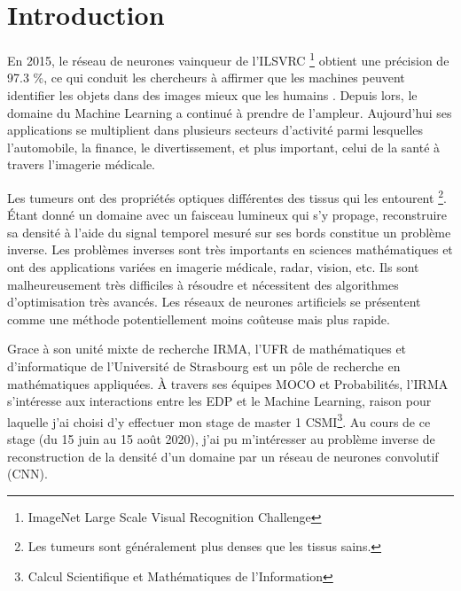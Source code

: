 
\chapter{Introduction} %

\label{Chapter1} %


\newcommand{\keyword}[1]{\textbf{#1}}
\newcommand{\tabhead}[1]{\textbf{#1}}
\newcommand{\code}[1]{\texttt{#1}}
\newcommand{\file}[1]{\texttt{\bfseries#1}}
\newcommand{\option}[1]{\texttt{\itshape#1}}


En 2015, le réseau de neurones vainqueur de l'ILSVRC \footnote{ImageNet Large Scale Visual Recognition Challenge} obtient une précision de 97.3 \%, ce qui conduit les chercheurs à affirmer que les machines peuvent identifier les objets dans des images mieux que les humains \parencite{Reference1}. Depuis lors, le domaine du Machine Learning a continué à prendre de l'ampleur. Aujourd'hui ses applications se multiplient dans plusieurs secteurs d'activité parmi lesquelles l'automobile, la finance, le divertissement, et plus important, celui de la santé à travers l'imagerie médicale.

Les tumeurs ont des propriétés optiques différentes des tissus qui les entourent \footnote{Les tumeurs sont généralement plus denses que les tissus sains.}. Étant donné un domaine avec un faisceau lumineux qui s'y propage, reconstruire sa densité à l'aide du signal temporel mesuré sur ses bords constitue un problème inverse. Les problèmes inverses sont très importants en sciences mathématiques et ont des applications variées en imagerie médicale, radar, vision, etc. Ils sont malheureusement très difficiles à résoudre et nécessitent des algorithmes d'optimisation très avancés. Les réseaux de neurones artificiels se présentent comme une méthode potentiellement moins coûteuse mais plus rapide.

Grace à son unité mixte de recherche IRMA, l'UFR de mathématiques et d'informatique de l'Université de Strasbourg est un pôle de recherche en mathématiques appliquées. À travers ses équipes MOCO et Probabilités, l'IRMA s'intéresse aux interactions entre les EDP et le Machine Learning, raison pour laquelle j'ai choisi d'y effectuer mon stage de master 1 CSMI\footnote{Calcul Scientifique et Mathématiques de l'Information}. Au cours de ce stage (du 15 juin au 15 août 2020), j'ai pu m'intéresser au problème inverse de reconstruction de la densité d'un domaine par un réseau de neurones convolutif (CNN).

